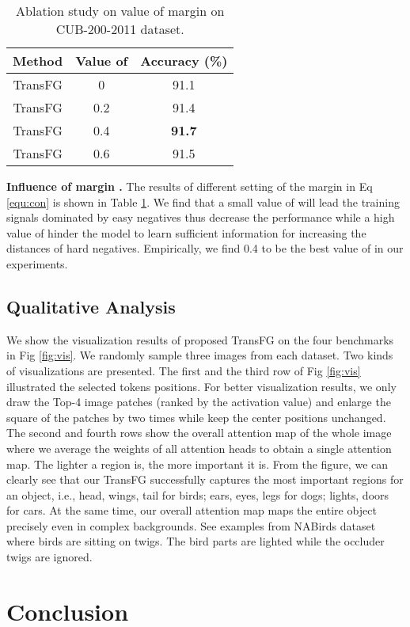 \documentclass[10pt,twocolumn,letterpaper]{article}
\begin{document}
\begin{table}[]
    \small
    \centering
    \caption{Ablation study on value of margin  on CUB-200-2011 dataset.}
    \label{tab:abalpha}
    \begin{tabular}{|c|c|c|}
    \hline
    Method & Value of  & Accuracy (\%) \\ \hline
    TransFG & 0 & 91.1 \\ 
    TransFG & 0.2 & 91.4 \\ 
    TransFG & 0.4 & \textbf{91.7} \\ 
    TransFG & 0.6 & 91.5 \\ \hline
    \end{tabular}
\end{table}

\textbf{Influence of margin .} The results of different setting of the margin  in Eq \ref{equ:con} is shown in Table \ref{tab:abalpha}. We find that a small value of  will lead the training signals dominated by easy negatives thus decrease the performance while a high value of  hinder the model to learn sufficient information for increasing the distances of hard negatives. Empirically, we find 0.4 to be the best value of  in our experiments. 

\subsection{Qualitative Analysis}
\label{sec:qual}

We show the visualization results of proposed TransFG on the four benchmarks in Fig \ref{fig:vis}. We randomly sample three images from each dataset. Two kinds of visualizations are presented. The first and the third row of Fig \ref{fig:vis} illustrated the selected tokens positions. For better visualization results, we only draw the Top-4 image patches (ranked by the activation value) and enlarge the square of the patches by two times while keep the center positions unchanged. The second and fourth rows show the overall attention map of the whole image where we average the weights of all attention heads to obtain a single attention map. The lighter a region is, the more important it is. From the figure, we can clearly see that our TransFG successfully captures the most important regions for an object, i.e., head, wings, tail for birds; ears, eyes, legs for dogs; lights, doors for cars. At the same time, our overall attention map maps the entire object precisely even in complex backgrounds. See examples from NABirds dataset where birds are sitting on twigs. The bird parts are lighted while the occluder twigs are ignored. \section{Conclusion}
\end{document}
